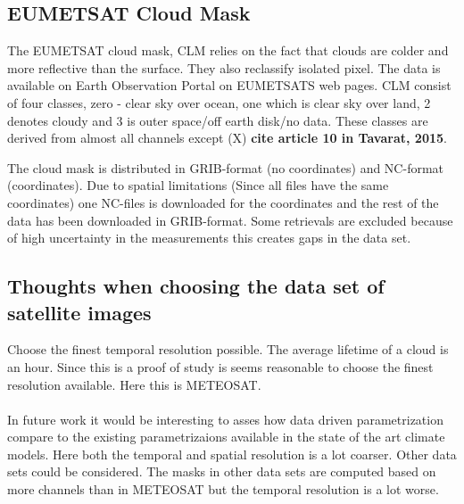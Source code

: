 \subsection{EUMETSAT Cloud Mask} \label{sec:EUMETSAT_cloud_mask}
The EUMETSAT cloud mask, CLM relies on the fact that clouds are colder and more reflective than the surface. They also reclassify isolated pixel. The data is available on Earth Observation Portal on EUMETSATS web pages. CLM consist of four classes, zero - clear sky over ocean, one which is clear sky over land, 2 denotes cloudy and 3 is outer space/off earth disk/no data. These classes are derived from almost all channels except (X) \textbf{cite article 10 in Tavarat, 2015}.

The cloud mask is distributed in GRIB-format (no coordinates) and NC-format (coordinates). Due to spatial limitations (Since all files have the same coordinates) one NC-files is downloaded for the coordinates and the rest of the data has been downloaded in GRIB-format. Some retrievals are excluded because of high uncertainty in the measurements this creates gaps in the data set. 


\subsection{Thoughts when choosing the data set of satellite images}
Choose the finest temporal resolution possible. The average lifetime of a cloud is an hour. Since this is a proof of study is seems reasonable to choose the finest resolution available. Here this is METEOSAT. 
\\ \\
In future work it would be interesting to asses how data driven parametrization compare to the existing parametrizaions available in the state of the art climate models. Here both the temporal and spatial resolution is a lot coarser. Other data sets could be considered. The masks in other data sets are computed based on more channels than in METEOSAT but the temporal resolution is a lot worse. 

